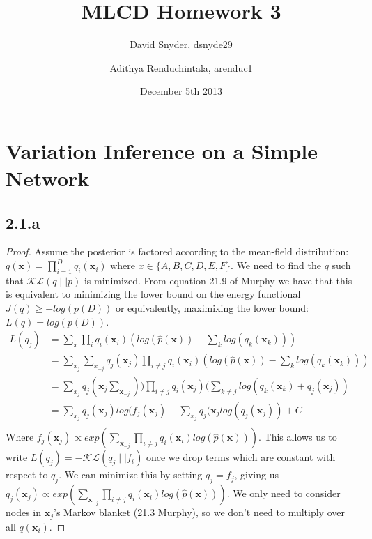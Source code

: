 \documentclass{article}
\title{MLCD Homework 3}
\date{December 5th 2013}
\author{David Snyder, dsnyde29
        \and Adithya Renduchintala, arenduc1}
\begin{document}
\maketitle

\section*{Variation Inference on a Simple Network}
\subsection*{2.1.a}

\begin{proof}
   Assume the posterior is factored according to the mean-field distribution:
   $q(\textbf{x}) = \prod_{i=1}^{D} q_{i}(\textbf{x}_{i})$ 
   where $x \in \{A,B,C,D,E,F\}$.
   We need to find the $q$ such that $\mathcal{K}\mathcal{L} (q \mid \mid p)$ is minimized.
   From equation 21.9 of Murphy we have that this is equivalent to minimizing the lower
   bound on the energy functional $J(q) \ge -log(p(D))$ or equivalently, maximixing the
   lower bound: $L(q) = log(p(D))$.
  \begin{align*}
     L(q_{j}) &= \sum_{x} \prod_{i} q_{i} (\textbf{x}_{i}) (log(\hat{p} (\textbf{x})) - \sum_{k} log(q_{k} (\textbf{x}_{k}))) \\
     &= \sum_{x_{j}} \sum_{x_{-j}} q_{j} (\textbf{x}_{j}) \prod_{i \ne j} q_{i}(\textbf{x}_{i}) (log(\hat{p}(\textbf{x})) - \sum_{k} log(q_{k}(\textbf{x}_{k}))) \\
     &= \sum_{x_{j}} q_{j}(\textbf{x}_{j} \sum_{\textbf{x}_{-j}})) \prod_{i \ne j} q_{i}(\textbf{x}_{j})(\sum_{k \ne j} log(q_{k}(\textbf{x}_{k}) + q_{j}(\textbf{x}_{j})) \\
     &= \sum_{x_{j}} q_{j}(\textbf{x}_{j}) log(f_{j}(\textbf{x}_{j}) - \sum_{x_{j}} q_{j}(\textbf{x}_{j} log(q_{j}(\textbf{x}_{j})) + C \\
 \end{align*}
 Where $f_{j}(\textbf{x}_{j}) \propto exp(\sum_{\textbf{x}_{-j}} \prod_{i \ne j } q_{i}(\textbf{x}_{i}) log( \hat{p}(\textbf{x})))$.
This allows us to write $L(q_{j}) = - \mathcal{K} \mathcal{L} (q_{j} \mid \mid f_{i})$ once we drop terms which are constant with respect to $q_{j}$. We can minimize this by setting $q_{j} = f_{j}$,
 giving us $q_{j}(\textbf{x}_{j}) \propto exp(\sum_{\textbf{x}_{-j}} \prod_{i \ne j } q_{i}(\textbf{x}_{i}) log( \hat{p}(\textbf{x})))$.
 We only need to consider nodes in $\textbf{x}_{j}$'s Markov blanket (21.3 Murphy), so we don't need to multiply over all $q(\textbf{x}_{i})$.
\end{proof}
\end{document}
